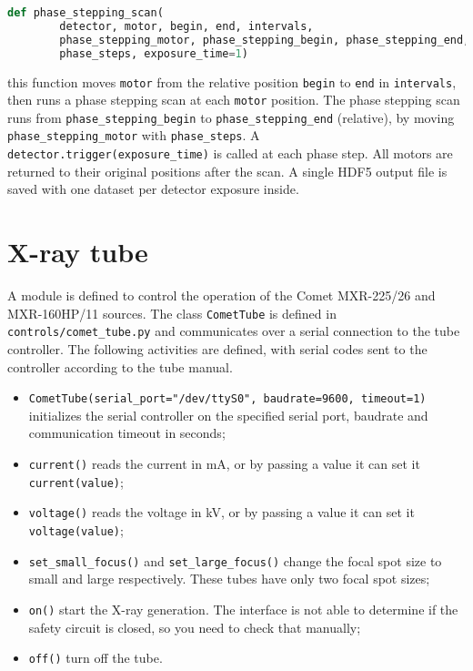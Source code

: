 \begin{lstlisting}[language=Python]
def phase_stepping_scan(
        detector, motor, begin, end, intervals,
        phase_stepping_motor, phase_stepping_begin, phase_stepping_end,
        phase_steps, exposure_time=1)
\end{lstlisting}
this function moves \texttt{motor} from the relative position \texttt{begin}
to \texttt{end} in \texttt{intervals}, then runs a phase stepping scan at
each \texttt{motor} position. The phase stepping scan runs from
\texttt{phase\_stepping\_begin} to
\texttt{phase\_stepping\_end} (relative), by moving
\texttt{phase\_stepping\_motor} with 
\texttt{phase\_steps}. A \texttt{detector.trigger(exposure\_time)} is called
at each phase step.
All motors are returned to their original positions after the scan.
A single HDF5 output file is saved with one dataset per detector exposure
inside.

\section{X-ray tube}
A module is defined to control the operation of the Comet MXR-225/26 and
MXR-160HP/11 sources. The class \texttt{CometTube} is defined in
\texttt{controls/comet\_tube.py} and communicates over a serial connection
to the tube controller.
The following activities are defined, with serial codes sent to the
controller according to the tube manual\cn.

\begin{itemize}
    \item \verb|CometTube(serial_port="/dev/ttyS0", baudrate=9600, timeout=1)|
        initializes the serial controller on the specified
        serial port, baudrate and communication timeout in seconds;
    \item \verb|current()| reads the current in \si{\milli\ampere}, or
        by passing a value it can set it \verb|current(value)|;
    \item \verb|voltage()| reads the voltage in \si{\kilo\volt}, or
        by passing a value it can set it \verb|voltage(value)|;
    \item \verb|set_small_focus()| and \verb|set_large_focus()| change the
        focal spot size to small and large respectively. These tubes have
        only two focal spot sizes;
    \item \verb|on()| start the X-ray generation. The interface is not able
        to determine if the safety circuit is closed, so you need to check
        that manually;
    \item \verb|off()| turn off the tube.
\end{itemize}
